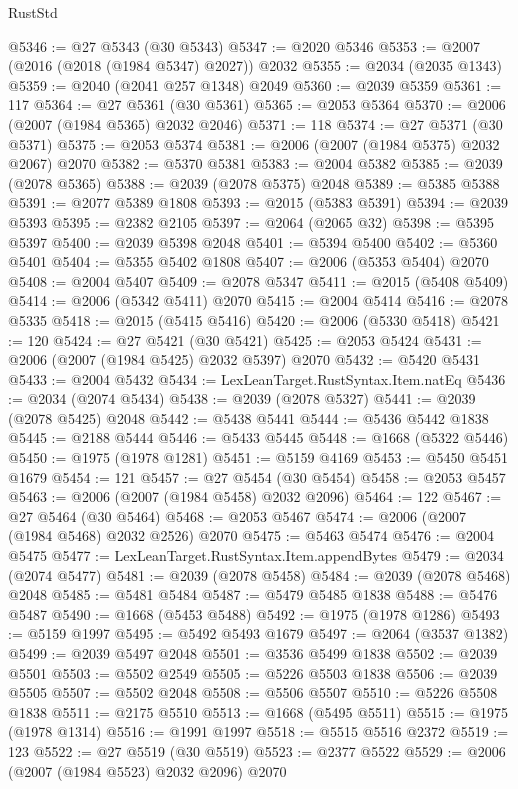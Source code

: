 \begin{lexlean}{RustStd}
\begin{coremodule}
@5346 := @27 @5343 (@30 @5343)
@5347 := @2020 @5346
@5353 := @2007 (@2016 (@2018 (@1984 @5347) @2027)) @2032
@5355 := @2034 (@2035 @1343)
@5359 := @2040 (@2041 @257 @1348) @2049
@5360 := @2039 @5359
@5361 := 117
@5364 := @27 @5361 (@30 @5361)
@5365 := @2053 @5364
@5370 := @2006 (@2007 (@1984 @5365) @2032 @2046)
@5371 := 118
@5374 := @27 @5371 (@30 @5371)
@5375 := @2053 @5374
@5381 := @2006 (@2007 (@1984 @5375) @2032 @2067) @2070
@5382 := @5370 @5381
@5383 := @2004 @5382
@5385 := @2039 (@2078 @5365)
@5388 := @2039 (@2078 @5375) @2048
@5389 := @5385 @5388
@5391 := @2077 @5389 @1808
@5393 := @2015 (@5383 @5391)
@5394 := @2039 @5393
@5395 := @2382 @2105
@5397 := @2064 (@2065 @32)
@5398 := @5395 @5397
@5400 := @2039 @5398 @2048
@5401 := @5394 @5400
@5402 := @5360 @5401
@5404 := @5355 @5402 @1808
@5407 := @2006 (@5353 @5404) @2070
@5408 := @2004 @5407
@5409 := @2078 @5347
@5411 := @2015 (@5408 @5409)
@5414 := @2006 (@5342 @5411) @2070
@5415 := @2004 @5414
@5416 := @2078 @5335
@5418 := @2015 (@5415 @5416)
@5420 := @2006 (@5330 @5418)
@5421 := 120
@5424 := @27 @5421 (@30 @5421)
@5425 := @2053 @5424
@5431 := @2006 (@2007 (@1984 @5425) @2032 @5397) @2070
@5432 := @5420 @5431
@5433 := @2004 @5432
@5434 := LexLeanTarget.RustSyntax.Item.natEq
@5436 := @2034 (@2074 @5434)
@5438 := @2039 (@2078 @5327)
@5441 := @2039 (@2078 @5425) @2048
@5442 := @5438 @5441
@5444 := @5436 @5442 @1838
@5445 := @2188 @5444
@5446 := @5433 @5445
@5448 := @1668 (@5322 @5446)
@5450 := @1975 (@1978 @1281)
@5451 := @5159 @4169
@5453 := @5450 @5451 @1679
@5454 := 121
@5457 := @27 @5454 (@30 @5454)
@5458 := @2053 @5457
@5463 := @2006 (@2007 (@1984 @5458) @2032 @2096)
@5464 := 122
@5467 := @27 @5464 (@30 @5464)
@5468 := @2053 @5467
@5474 := @2006 (@2007 (@1984 @5468) @2032 @2526) @2070
@5475 := @5463 @5474
@5476 := @2004 @5475
@5477 := LexLeanTarget.RustSyntax.Item.appendBytes
@5479 := @2034 (@2074 @5477)
@5481 := @2039 (@2078 @5458)
@5484 := @2039 (@2078 @5468) @2048
@5485 := @5481 @5484
@5487 := @5479 @5485 @1838
@5488 := @5476 @5487
@5490 := @1668 (@5453 @5488)
@5492 := @1975 (@1978 @1286)
@5493 := @5159 @1997
@5495 := @5492 @5493 @1679
@5497 := @2064 (@3537 @1382)
@5499 := @2039 @5497 @2048
@5501 := @3536 @5499 @1838
@5502 := @2039 @5501
@5503 := @5502 @2549
@5505 := @5226 @5503 @1838
@5506 := @2039 @5505
@5507 := @5502 @2048
@5508 := @5506 @5507
@5510 := @5226 @5508 @1838
@5511 := @2175 @5510
@5513 := @1668 (@5495 @5511)
@5515 := @1975 (@1978 @1314)
@5516 := @1991 @1997
@5518 := @5515 @5516 @2372
@5519 := 123
@5522 := @27 @5519 (@30 @5519)
@5523 := @2377 @5522
@5529 := @2006 (@2007 (@1984 @5523) @2032 @2096) @2070

\end{coremodule}
\end{lexlean}
